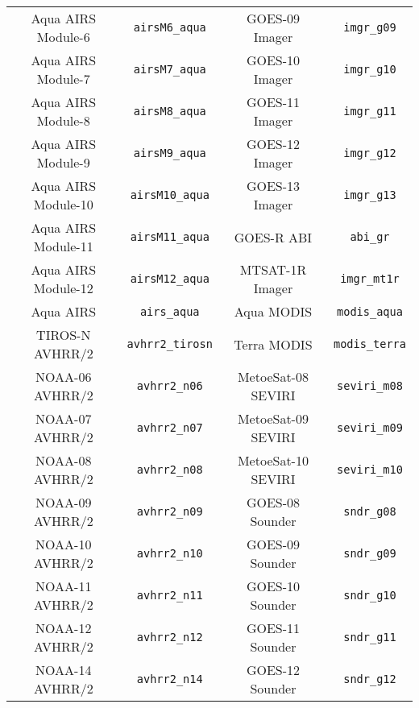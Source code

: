 \begin{table}[htp]
\begin{tabular}{|c|c||c|c|}
Aqua AIRS Module-6  & \texttt{airsM6\_aqua}        & GOES-09 Imager & \texttt{imgr\_g09}                       \\
Aqua AIRS Module-7  & \texttt{airsM7\_aqua}        & GOES-10 Imager & \texttt{imgr\_g10}                       \\
Aqua AIRS Module-8  & \texttt{airsM8\_aqua}        & GOES-11 Imager & \texttt{imgr\_g11}                       \\
Aqua AIRS Module-9  & \texttt{airsM9\_aqua}        & GOES-12 Imager & \texttt{imgr\_g12}                       \\
Aqua AIRS Module-10 & \texttt{airsM10\_aqua}       & GOES-13 Imager & \texttt{imgr\_g13}                       \\
Aqua AIRS Module-11 & \texttt{airsM11\_aqua}       & GOES-R ABI & \texttt{abi\_gr}                             \\
Aqua AIRS Module-12 & \texttt{airsM12\_aqua}       & MTSAT-1R Imager & \texttt{imgr\_mt1r}                     \\
Aqua AIRS & \texttt{airs\_aqua}                    & Aqua MODIS & \texttt{modis\_aqua}                         \\
TIROS-N AVHRR/2 & \texttt{avhrr2\_tirosn}          & Terra MODIS & \texttt{modis\_terra}                       \\
NOAA-06 AVHRR/2 & \texttt{avhrr2\_n06}             & MetoeSat-08 SEVIRI & \texttt{seviri\_m08}                 \\
NOAA-07 AVHRR/2 & \texttt{avhrr2\_n07}             & MetoeSat-09 SEVIRI & \texttt{seviri\_m09}                 \\
NOAA-08 AVHRR/2 & \texttt{avhrr2\_n08}             & MetoeSat-10 SEVIRI & \texttt{seviri\_m10}                 \\
NOAA-09 AVHRR/2 & \texttt{avhrr2\_n09}             & GOES-08 Sounder & \texttt{sndr\_g08}                      \\
NOAA-10 AVHRR/2 & \texttt{avhrr2\_n10}             & GOES-09 Sounder & \texttt{sndr\_g09}                      \\
NOAA-11 AVHRR/2 & \texttt{avhrr2\_n11}             & GOES-10 Sounder & \texttt{sndr\_g10}                      \\
NOAA-12 AVHRR/2 & \texttt{avhrr2\_n12}             & GOES-11 Sounder & \texttt{sndr\_g11}                      \\
NOAA-14 AVHRR/2 & \texttt{avhrr2\_n14}             & GOES-12 Sounder & \texttt{sndr\_g12}                      \\

\end{tabular}
\end{table}
